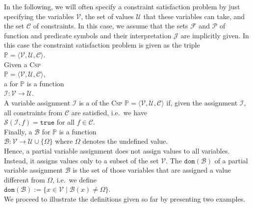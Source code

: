 In the following, we will often specify a constraint satisfaction problem by just specifying the variables
$\mathcal{V}$,  the set of values $\mathcal{U}$ that these variables can take, and the set $\mathcal{C}$ of
constraints.  In this case, we assume that the sets $\mathcal{F}$ and $\mathcal{P}$ of function and predicate
symbols and their interpretation $\mathcal{J}$ are implicitly given.  In this case the constraint satisfaction
problem is given as the triple 
\\[0.2cm]
\hspace*{1.3cm}
$\mathbb{P} = \langle \mathcal{V}, \mathcal{U}, \mathcal{C} \rangle$.
\\[0.2cm]
Given a \textsc{Csp}
\\[0.2cm]
\hspace*{1.3cm}
 $\mathbb{P} = \langle \mathcal{V}, \mathcal{U}, \mathcal{C} \rangle$, 
\\[0.2cm]
a  for $\mathbb{P}$ is a function
\\[0.2cm]
\hspace*{1.3cm}
$\mathcal{I}: \mathcal{V} \rightarrow \mathcal{U}$.
\\[0.2cm]
A variable assignment $\mathcal{I}$ is a  of the \textsc{Csp}
$\mathbb{P}= \langle \mathcal{V}, \mathcal{U}, \mathcal{C} \rangle$ 
if, given the assignment $\mathcal{I}$, all constraints from $\mathcal{C}$ are satisfied, i.e.~we have
\\[0.2cm]
\hspace*{1.3cm}
$\mathcal{S}(\mathcal{I}, f) = \mathtt{true}$ \quad for all $f \in \mathcal{C}$.
\\[0.2cm]
Finally, a   $\mathcal{B}$ for $\mathbb{P}$ is a function
\\[0.2cm]
\hspace*{1.3cm}
$\mathcal{B}: \mathcal{V} \rightarrow \mathcal{U} \cup \{ \Omega \}$ \quad where $\Omega$ denotes the undefined value.
\\[0.2cm]
Hence, a partial variable assignment does not assign values to all variables.  Instead, it assigns values only
to a subset of the set $\mathcal{V}$.  The  $\mathtt{dom}(\mathcal{B})$  of a partial variable assignment $\mathcal{B}$ is the
set of those variables that are assigned a value different from $\Omega$, i.e.~we define
\\[0.2cm]
\hspace*{1.3cm}
$\mathtt{dom}(\mathcal{B}) := \bigl\{ x \in \mathcal{V} \mid \mathcal{B}(x) \not= \Omega \bigr\}$.
\\[0.2cm]
We proceed to illustrate the definitions given so far by presenting two examples.


